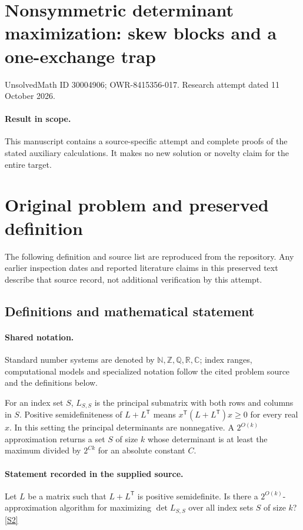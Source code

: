 \documentclass[11pt]{article}
\begin{document}
\section*{Nonsymmetric determinant maximization: skew blocks and a one-exchange trap}
\noindent UnsolvedMath ID 30004906; OWR-8415356-017. Research attempt dated 11 October 2026.
\paragraph{Result in scope.}This manuscript contains a source-specific attempt and complete proofs of the stated auxiliary calculations. It makes no new solution or novelty claim for the entire target.
\section{Original problem and preserved definition}
The following definition and source list are reproduced from the repository. Any earlier inspection dates and reported literature claims in this preserved text describe that source record, not additional verification by this attempt.
\subsection{Definitions and mathematical statement}

\paragraph{Shared notation.}Standard number systems are denoted by $\mathbb N,\mathbb Z,\mathbb Q,\mathbb R,\mathbb C$; index ranges, computational models and specialized notation follow the cited problem source and the definitions below.


For an index set $S$, $L_{S,S}$ is the principal submatrix with both rows and columns in $S$. Positive semidefiniteness of $L+L^{\mathsf T}$ means $x^{\mathsf T}(L+L^{\mathsf T})x\geq0$ for every real $x$. In this setting the principal determinants are nonnegative. A $2^{O(k)}$ approximation returns a set $S$ of size $k$ whose determinant is at least the maximum divided by $2^{Ck}$ for an absolute constant $C$.
\paragraph{Statement recorded in the supplied source.}
Let $L$ be a matrix such that $L+L^\mathsf T$ is positive semidefinite. Is there a $2^{O(k)}$-approximation algorithm for maximizing $\det L_{S,S}$ over all index sets $S$ of size $k$? \href{https://doi.org/10.4171/owr/2021/53}{[S2]}
\end{document}
